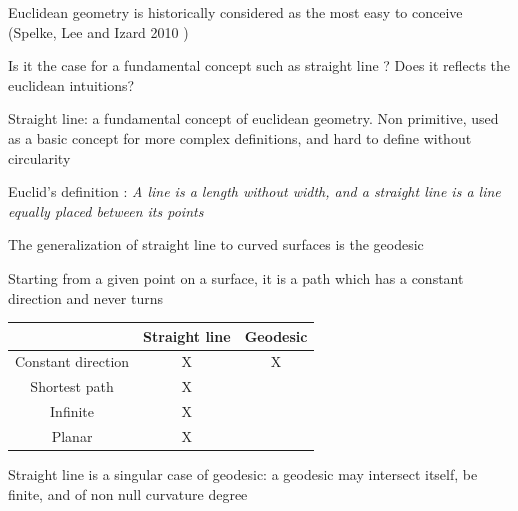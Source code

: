 \documentclass[11pt]{beamer}
\begin{document}
        \begin{frame}

          Euclidean geometry is historically considered as the most easy to conceive (Spelke, Lee and Izard 2010 )

          Is it the case for a fundamental concept such as straight line ? Does it reflects the euclidean intuitions?

        \end{frame}
        
        \begin{frame}


          Straight line: a fundamental concept of euclidean geometry. Non primitive, used as a basic concept for more complex definitions, and hard to define without circularity

          Euclid's definition : \textit{A line is a length without width, and a straight line is a line equally placed between its points}

        \end{frame}

        \begin{frame}

           The generalization of straight line to curved surfaces is the geodesic

          Starting from a given point on a surface, it is a path which has a constant direction and never turns

        \end{frame}
        

        \begin{frame}

          
         

          
          \hfill
          
          \begin{tabular}{c|c|c}



                  &   Straight line   & Geodesic  \\

            \hline
            
             Constant direction  &  X  &  X   \\

             Shortest path       &  X  &      \\

             Infinite              &  X  &      \\

             Planar            &  X  &      \\


          \end{tabular}

          \hfill
          
          Straight line is a singular case of geodesic: a geodesic may intersect itself, be finite, and of non null curvature degree

        \end{frame}
       
\end{document}
